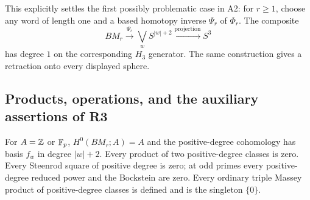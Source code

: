 This explicitly settles the first possibly problematic case in A2:
for $r\geq1$, choose any word of length one and a based homotopy inverse
$\Psi_r$ of $\Phi_r$.  The composite
\[
 BM_r\xrightarrow{\Psi_r}\bigvee_{w}S^{|w|+2}
         \xrightarrow{\text{projection}}S^3
\]
has degree $1$ on the corresponding $H_3$ generator.  The same
construction gives a retraction onto every displayed sphere.

\subsection{Products, operations, and the auxiliary assertions of R3}

\begin{proposition}\label{prop:Mr-cohomology}
For $A=\mathbb Z$ or $\mathbb F_p$, $H^0(BM_r;A)=A$ and the positive-degree
cohomology has basis $f_w$ in degree $|w|+2$.  Every product of two
positive-degree classes is zero.  Every Steenrod square of positive
degree is zero; at odd primes every positive-degree reduced power and
the Bockstein are zero.  Every ordinary triple Massey product of
positive-degree classes is defined and is the singleton $\{0\}$.
\end{proposition}
